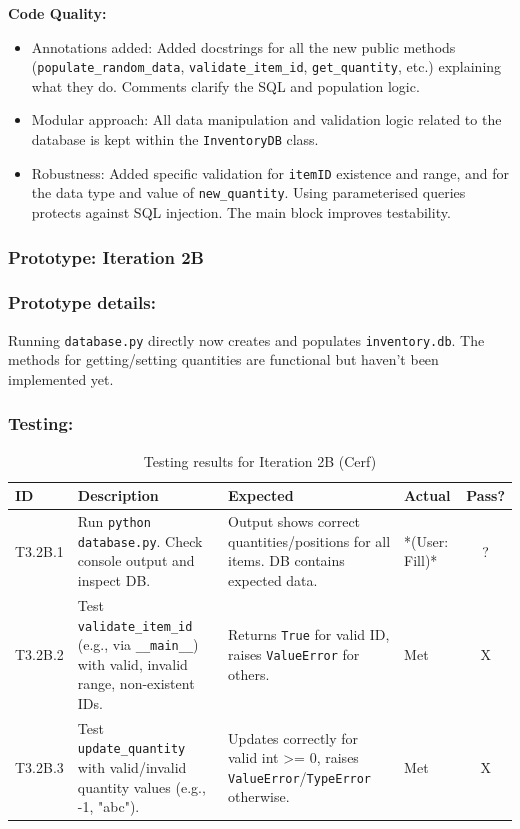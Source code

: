 \textbf{Code Quality:}
\begin{itemize}
	\item Annotations added: Added docstrings for all the new public methods (\verb|populate_random_data|, \verb|validate_item_id|, \verb|get_quantity|, etc.) explaining what they do. Comments clarify the SQL and population logic.
	\item Modular approach: All data manipulation and validation logic related to the database is kept within the \verb|InventoryDB| class.
	\item Robustness: Added specific validation for \verb|itemID| existence and range, and for the data type and value of \verb|new_quantity|. Using parameterised queries protects against SQL injection. The main block improves testability.
\end{itemize}

\newpage
\subsubsection*{Prototype: Iteration 2B}

\newpage

\subsubsection{Prototype details:}
Running \verb|database.py| directly now creates and populates \verb|inventory.db|. The methods for getting/setting quantities are functional but haven't been implemented yet.

\subsubsection{Testing:}
\begin{table}[htbp]
	\centering
	\begin{tabularx}{\textwidth}{|l|X|p{4.5cm}|p{1.5cm}|c|}
		\hline
		\textbf{ID} & \textbf{Description} & \textbf{Expected} & \textbf{Actual} & \textbf{Pass?} \\
		\hline
		T3.2B.1 & Run \verb|python database.py|. Check console output and inspect DB. & Output shows correct quantities/positions for all items. DB contains expected data. & *(User: Fill)* & ? \\
		\hline
		T3.2B.2 & Test \verb|validate_item_id| (e.g., via \verb|__main__|) with valid, invalid range, non-existent IDs. & Returns \verb|True| for valid ID, raises \verb|ValueError| for others. & Met & X \\
		\hline
		T3.2B.3 & Test \verb|update_quantity| with valid/invalid quantity values (e.g., -1, "abc"). & Updates correctly for valid int >= 0, raises \verb|ValueError|/\verb|TypeError| otherwise. & Met & X \\
		\hline
	\end{tabularx}
	\caption{Testing results for Iteration 2B (Cerf)}
\end{table}

